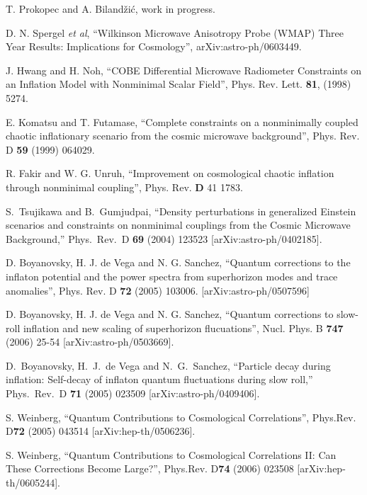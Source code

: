 \begin{thebibliography}{999}

 T. Prokopec and A. Biland\v{z}i\'c,
 work in progress.

 D. N. Spergel \textit{et al}, ``Wilkinson Microwave Anisotropy Probe (WMAP)
Three Year Results: Implications for Cosmology'',
arXiv:astro-ph/0603449.

 J. Hwang and H. Noh, ``COBE Differential Microwave Radiometer Constraints on an Inflation Model
with Nonminimal Scalar Field'', Phys. Rev. Lett. \textbf{81},
(1998) 5274.

 E. Komatsu and T. Futamase, ``Complete constraints on a nonminimally coupled chaotic inflationary scenario
from the cosmic microwave background'', Phys. Rev. D \textbf{59}
(1999) 064029.

 R. Fakir and W. G. Unruh, 
``Improvement on cosmological chaotic inflation through nonminimal coupling'',
 Phys. Rev. \textbf{D} 41 1783.

  S.~Tsujikawa and B.~Gumjudpai,
  ``Density perturbations in generalized Einstein scenarios and constraints on
  nonminimal couplings from the Cosmic Microwave Background,''
  Phys.\ Rev.\  D {\bf 69} (2004) 123523
  [arXiv:astro-ph/0402185].

 D. Boyanovsky, H. J. de
Vega and N. G. Sanchez, ``Quantum corrections to the inflaton
potential and the power spectra from superhorizon modes and trace
anomalies'', Phys. Rev. D \textbf{72} (2005) 103006.
[arXiv:astro-ph/0507596]

 D. Boyanovsky, H. J. de
Vega and N. G. Sanchez, ``Quantum corrections to slow-roll
inflation and new scaling of superhorizon flucuations'', Nucl.
Phys. B \textbf{747} (2006) 25-54 [arXiv:astro-ph/0503669].

  D.~Boyanovsky, H.~J.~de Vega and N.~G.~Sanchez,
  ``Particle decay during inflation: Self-decay of inflaton quantum
  fluctuations during slow roll,''
  Phys.\ Rev.\  D {\bf 71} (2005) 023509
  [arXiv:astro-ph/0409406].

 S. Weinberg, ``Quantum Contributions to Cosmological
Correlations'', Phys.Rev. D\textbf{72} (2005) 043514
[arXiv:hep-th/0506236].

 S. Weinberg, ``Quantum Contributions to Cosmological Correlations II: Can These Corrections Become
Large?'', Phys.Rev. D\textbf{74} (2006) 023508
[arXiv:hep-th/0605244].


\end{thebibliography}
